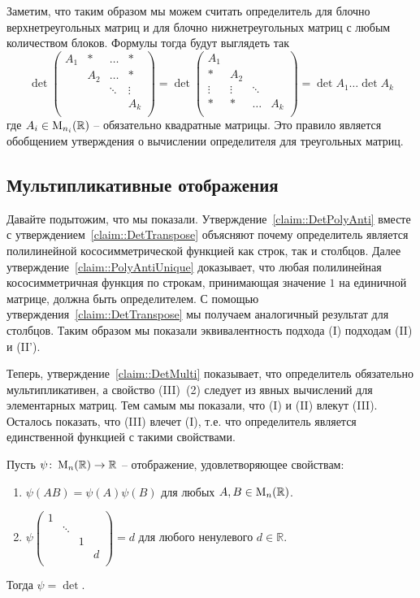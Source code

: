 Заметим, что таким образом мы можем считать определитель для блочно верхнетреугольных матриц и для блочно нижнетреугольных матриц с любым количеством блоков.
Формулы тогда будут выглядеть так
\[
\det
\begin{pmatrix}
{A_1}&{*}&{\ldots}&{*}\\
{}&{A_2}&{\ldots}&{*}\\
{}&{}&{\ddots}&{\vdots}\\
{}&{}&{}&{A_k}\\
\end{pmatrix}
=
\det
\begin{pmatrix}
{A_1}&{}&{}&{}\\
{*}&{A_2}&{}&{}\\
{\vdots}&{\vdots}&{\ddots}&{}\\
{*}&{*}&{\ldots}&{A_k}\\
\end{pmatrix}
=\det A_1 \ldots \det A_k
\]
где $A_i\in\operatorname{M}_{n_i}(\mathbb R)$ -- обязательно квадратные матрицы.
Это правило является обобщением утверждения о вычислении определителя для треугольных матриц.

\subsection{Мультипликативные отображения}

Давайте подытожим, что мы показали.
Утверждение~\ref{claim::DetPolyAnti} вместе с утверждением~\ref{claim::DetTranspose} объясняют почему определитель является полилинейной кососимметрической функцией как строк, так и столбцов.
Далее утверждение~\ref{claim::PolyAntiUnique} доказывает, что любая полилинейная кососимметричная функция по строкам, принимающая значение $1$ на единичной матрице, должна быть определителем.
С помощью утверждения~\ref{claim::DetTranspose} мы получаем аналогичный результат для столбцов.
Таким образом мы показали эквивалентность подхода (I) подходам (II) и (II').

Теперь, утверждение~\ref{claim::DetMulti} показывает, что определитель обязательно мультипликативен, а свойство (III)~(2) следует из явных вычислений для элементарных матриц.
Тем самым мы показали, что (I) и (II) влекут (III).
Осталось показать, что (III) влечет (I), т.е. что определитель является единственной функцией с такими свойствами.

\begin{claim}
\label{claim::DetMultiUnique}
Пусть $\psi\colon \operatorname{M}_{n}(\mathbb R)\to \mathbb R$ -- отображение, удовлетворяющее свойствам:
\begin{enumerate}
\item $\psi(AB) = \psi(A)\psi(B)$ для любых $A,B\in\operatorname{M}_{n}(\mathbb R)$.

\item 
$
\psi
\begin{pmatrix}
{1}&{}&{}&{}\\
{}&{\ddots}&{}&{}\\
{}&{}&{1}&{}\\
{}&{}&{}&{d}\\
\end{pmatrix}
= 
d
$ для любого ненулевого $d\in\mathbb R$.
\end{enumerate}
Тогда $\psi = \det$.
\end{claim}

